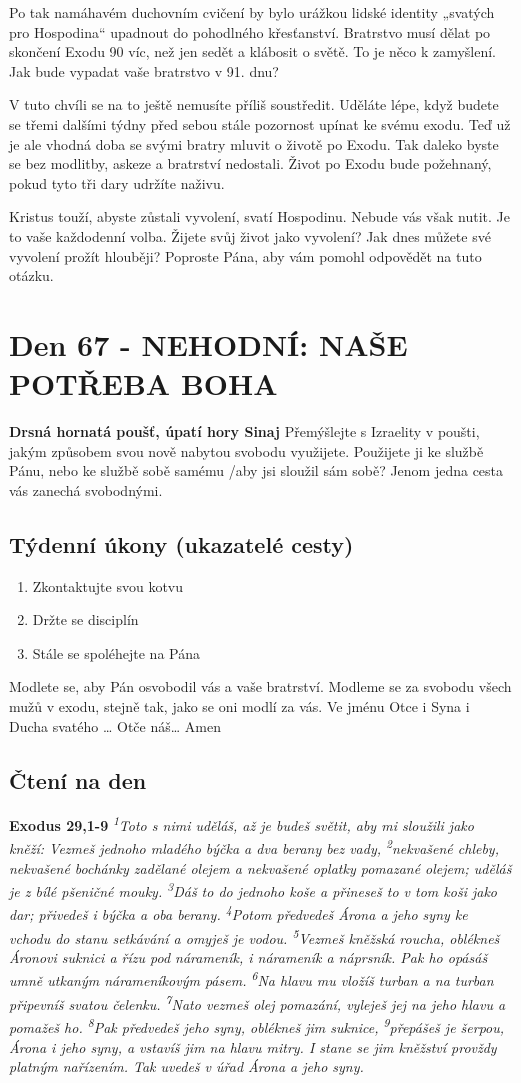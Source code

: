\documentclass[11pt]{article}
\newcommand{\zacatekDesatyTyden}{
\textbf{Drsná hornatá poušť, úpatí hory Sinaj} \newline 
Přemýšlejte s Izraelity v poušti, jakým způsobem svou nově nabytou svobodu využijete. Použijete ji ke službě Pánu, nebo ke službě sobě samému /aby jsi sloužil sám sobě? Jenom jedna cesta vás zanechá svobodnými.

\subsection*{Týdenní úkony (ukazatelé cesty)}
\begin{enumerate}
  \item Zkontaktujte svou kotvu
  \item Držte se disciplín
  \item Stále se spoléhejte na Pána
\end{enumerate}
Modlete se, aby Pán osvobodil vás a vaše bratrství. \newline
Modleme se za svobodu všech mužů v exodu, stejně tak, jako se oni modlí za vás.\newline
Ve jménu Otce i Syna i Ducha svatého …  Otče náš… Amen
}
\begin{document}
Po tak namáhavém duchovním cvičení by bylo urážkou lidské identity „svatých pro Hospodina“ upadnout do
pohodlného křesťanství. Bratrstvo musí dělat po skončení Exodu 90 víc, než jen sedět a klábosit o světě. To je něco
k zamyšlení. Jak bude vypadat vaše bratrstvo v 91. dnu?

V tuto chvíli se na to ještě nemusíte příliš soustředit. Uděláte lépe, když budete se třemi dalšími týdny před sebou stále
pozornost upínat ke svému exodu. Teď už je ale vhodná doba se svými bratry mluvit o životě po Exodu. Tak daleko
byste se bez modlitby, askeze a bratrství nedostali. Život po Exodu bude požehnaný, pokud tyto tři dary udržíte naživu.

Kristus touží, abyste zůstali vyvolení, svatí Hospodinu. Nebude vás však nutit. Je to vaše každodenní volba. Žijete svůj
život jako vyvolení? Jak dnes můžete své vyvolení prožít hlouběji? Poproste Pána, aby vám pomohl odpovědět na tuto
otázku.





\newpage
\section{Den 67 - NEHODNÍ: NAŠE POTŘEBA BOHA}
\zacatekDesatyTyden
\subsection*{Čtení na den}
\textbf{Exodus 29,1-9}
\newline
\textit{
\textsuperscript{1}Toto s nimi uděláš, až je budeš světit, aby mi sloužili jako kněží: Vezmeš jednoho mladého býčka a dva berany bez vady,
\textsuperscript{2}nekvašené chleby, nekvašené bochánky zadělané olejem a nekvašené oplatky pomazané olejem; uděláš je z bílé pšeničné mouky.
\textsuperscript{3}Dáš to do jednoho koše a přineseš to v tom koši jako dar; přivedeš i býčka a oba berany.
\textsuperscript{4}Potom předvedeš Árona a jeho syny ke vchodu do stanu setkávání a omyješ je vodou.
\textsuperscript{5}Vezmeš kněžská roucha, oblékneš Áronovi suknici a řízu pod nárameník, i nárameník a náprsník. Pak ho opásáš umně utkaným nárameníkovým pásem.
\textsuperscript{6}Na hlavu mu vložíš turban a na turban připevníš svatou čelenku.
\textsuperscript{7}Nato vezmeš olej pomazání, vyleješ jej na jeho hlavu a pomažeš ho.
\textsuperscript{8}Pak předvedeš jeho syny, oblékneš jim suknice,
\textsuperscript{9}přepášeš je šerpou, Árona i jeho syny, a vstavíš jim na hlavu mitry. I stane se jim kněžství provždy platným nařízením. Tak uvedeš v úřad Árona a jeho syny.
}
\end{document}
